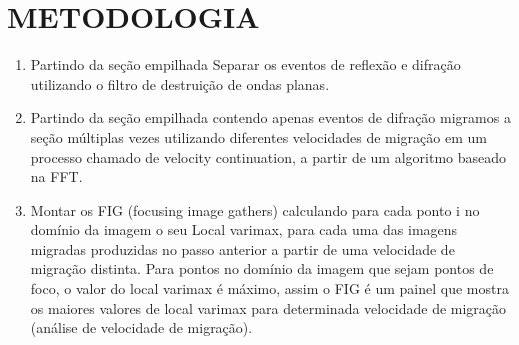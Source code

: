 \chapter{METODOLOGIA}
\label{met}

\begin{enumerate}
 \item Partindo da seção empilhada Separar os eventos de reflexão e difração utilizando o filtro de destruição de ondas planas.
 
 \item Partindo da seção empilhada contendo apenas eventos de difração migramos a seção múltiplas vezes utilizando
diferentes velocidades de migração em um processo chamado de velocity continuation, a partir de um algoritmo baseado
na FFT.

\item Montar os FIG (focusing image gathers) calculando para cada ponto i no domínio da imagem o seu Local varimax,
para cada uma das imagens migradas produzidas no passo anterior a partir de uma velocidade de migração distinta. 
Para pontos no domínio da imagem que sejam pontos de foco, o valor do local varimax é máximo, assim o FIG é um painel que mostra os maiores valores de local varimax para determinada velocidade de migração (análise de velocidade de migração).


\end{enumerate}
